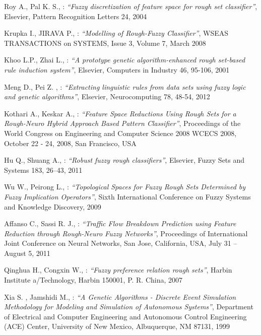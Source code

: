 

\begin{thebibliography}{99}

Roy A., Pal K. S., : \textit{``Fuzzy discretization of feature space for rough
set classifier''}, Elsevier, Pattern Recognition Letters 24, 2004

Krupka I., JIRAVA P., : \textit{``Modelling of Rough-Fuzzy Classifier''}, WSEAS
TRANSACTIONS on SYSTEMS, Issue 3, Volume 7, March 2008

Khoo L.P., Zhai L., : \textit{``A prototype genetic algorithm-enhanced rough
set-based rule induction system''}, Elsevier, Computers in Industry 46, 95-106,
2001

Meng D., Pei Z. , : \textit{``Extracting linguistic rules from data sets using fuzzy logic and
genetic algorithms''}, Elsevier, Neurocomputing 78, 48-54, 2012

Kothari A., Keskar A., : \textit{``Feature Space Reductions Using Rough Sets for a Rough-Neuro Hybrid Approach Based Pattern
Classifier''}, Proceedings of the World Congress on Engineering and Computer Science 2008 WCECS 2008, October 22 - 24, 2008, 
San Francisco, USA

Hu Q., Shuang A., : \textit{``Robust fuzzy rough classifiers''}, Elsevier, Fuzzy Sets and Systems 183, 26–43, 2011

Wu W., Peirong L., : \textit{``Topological Spaces for Fuzzy Rough Sets Determined by Fuzzy Implication
Operators''}, Sixth International Conference on Fuzzy Systems and Knowledge Discovery, 2009

Affanso C., Sassi R. J., : \textit{``Traffic Flow Breakdown Prediction using Feature
Reduction through Rough-Neuro Fuzzy Networks''}, Proceedings of International Joint Conference on Neural Networks, 
San Jose, California, USA, July 31 – August 5, 2011

Qinghua H., Congxin W., : \textit{``Fuzzy preference relation rough sets''},
Harbin Institute a/Technology, Harbin 150001, P. R. China, 2007

	Xia S. , Jamshidi M., : \textit{``A Genetic Algorithms - Discrete Event Simulation
  Methodology for Modeling and Simulation of Autonomous Systems''},
 Department of Electrical and Computer Engineering and Autonomous Control Engineering
 (ACE) Center, University of New Mexico, Albuquerque, NM 87131, 1999


\end{thebibliography}
